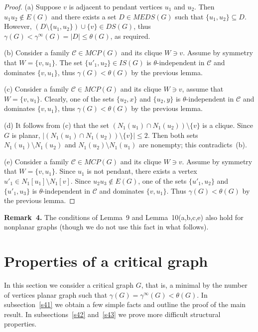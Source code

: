 \documentclass[12pt]{article}
\begin{document}
\begin{proof}
(a) Suppose $v$ is adjacent to pendant vertices $u_1$ and $u_2$. Then $u_1u_2 \notin E(G)$ and there exists a set $D \in MEDS(G)$ such that $\{u_1,u_2\} \subseteq D$. However, $(D \setminus \{u_1,u_2\}) \cup \{v\} \in DS(G)$, thus $\gamma(G) < \gamma^{\infty}(G) = |D| \leq \theta(G)$, as required. 

(b) Consider a family $\mathcal{C} \in MCP(G)$ and its clique $W \ni v$. Assume by symmetry that $W = \{v,u_1\}$. The set $\{u'_1,u_2\} \in IS(G)$ is $\theta$-independent in $\mathcal{C}$ and dominates $\{v,u_1\}$, thus $\gamma(G) < \theta(G)$ by the previous lemma.

(c) Consider a family $\mathcal{C} \in MCP(G)$ and its clique $W \ni v$, assume that $W = \{v,u_1\}$. Clearly, one of the sets $\{u_2,x\}$ and $\{u_2,y\}$ is $\theta$-independent in $\mathcal{C}$ and dominates $\{v,u_1\}$, thus $\gamma(G) < \theta(G)$ by the previous lemma.

(d) It follows from (c) that the set $(N_1(u_1) \cap N_1(u_2))  \setminus \{v\}$ is a clique. Since $G$ is planar, $|(N_1(u_1) \cap N_1(u_2)) \setminus \{v\}| \leq 2$.  Then both sets $N_1(u_1) \setminus N_1(u_2)$ and $N_1(u_2) \setminus N_1(u_1)$ are nonempty; this contradicts~(b). 

(e) Consider a family $\mathcal{C} \in MCP(G)$ and its clique $W \ni v$. Assume by symmetry that $W = \{v,u_1\}$. Since $u_1$ is not pendant, there exists a vertex $u'_1 \in N_1[u_1] \setminus N_1[v]$. Since $u_2u_3 \notin E(G)$, one of the sets $\{u'_1,u_2\}$ and $\{u'_1,u_3\}$ is $\theta$-independent in $\mathcal{C}$ and dominates $\{v,u_1\}$. Thus $\gamma(G) < \theta(G)$ by the previous lemma. 
\end{proof}

\textbf{Remark~4.} The conditions of Lemma~9 and Lemma~10(a,b,c,e) also hold for nonplanar graphs (though we do not use this fact in what follows).

\section{Properties of a critical graph}

In this section we consider a critical graph $G$, that is, a minimal by the number of vertices planar graph such that $\gamma(G) = \gamma^{\infty}(G) < \theta(G)$. In subsection~\ref{s41} we obtain a few simple facts and outline the proof of the main result. In subsections~\ref{s42} and~\ref{s43} we prove more difficult structural properties.
\end{document}
